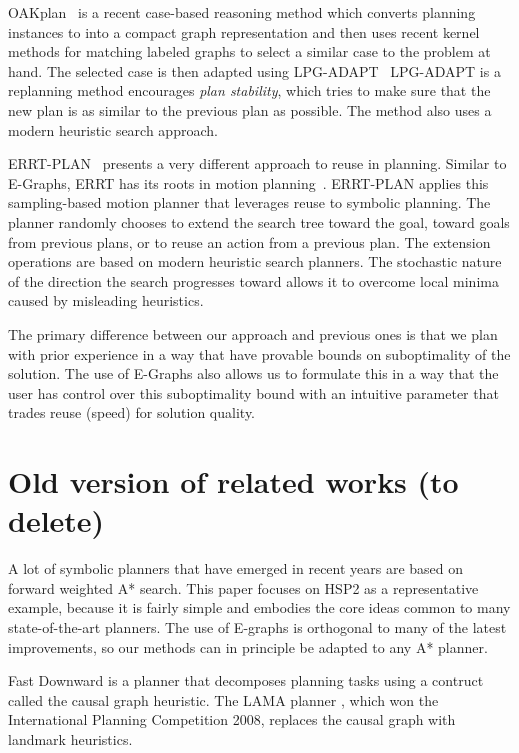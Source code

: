 \documentclass[letterpaper]{article}
\begin{document}
OAKplan~\cite{Serina:2010:KFC:1860143.1860472} is a recent 
case-based reasoning method which converts 
planning instances to into a compact graph representation and 
then uses recent kernel methods for matching labeled graphs to select
a similar case to the problem at hand. The selected case is then 
adapted using LPG-ADAPT~\cite{Fox06planstability} LPG-ADAPT is a replanning method 
encourages \textit{plan stability}, which tries to make 
sure that the new plan is as similar to the previous plan as possible. 
The method also uses a modern heuristic search approach.

ERRT-PLAN~\cite{workshop-icaps12-errtplan} presents a very different 
approach to reuse in planning. 
Similar to E-Graphs, ERRT has its roots in motion planning~\cite{Bruce:2002}.
ERRT-PLAN applies this sampling-based motion planner that leverages 
reuse to symbolic planning. The planner randomly chooses to extend 
the search tree toward the goal, toward goals from previous 
plans, or to reuse an action from a previous plan. 
The extension operations are based on modern heuristic search
planners.
The stochastic nature of the direction the search progresses toward
allows it to overcome local minima caused by misleading heuristics.

The primary difference between our approach and previous ones 
is that we plan with prior experience in a way that have provable
bounds on suboptimality of the solution. The use of E-Graphs also
allows us to formulate this in a way that the user has control over
this suboptimality bound with an intuitive parameter that trades
reuse (speed) for solution quality.

\section{Old version of related works (to delete)}

A lot of symbolic planners that have emerged in recent years are based on forward weighted A* search. This paper focuses on HSP2 as a representative example, because it is fairly simple and embodies the core ideas common to many state-of-the-art planners. The use of E-graphs is orthogonal to many of the latest improvements, so our methods can in principle be adapted to any A* planner.

Fast Downward \cite{helmert2006fast} is a planner that decomposes planning tasks using a contruct called the causal graph heuristic. The LAMA planner \cite{richter2010lama}, which won the International Planning Competition 2008, replaces the causal graph with landmark heuristics.
\end{document}
